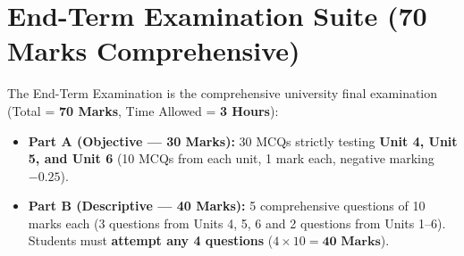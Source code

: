 \documentclass[a4paper,11pt,oneside,openany]{book}
\begin{document}
\newpage




\chapter{End-Term Examination Suite (70 Marks Comprehensive)}
\label{chap:endterm}
\noindent
The End-Term Examination is the comprehensive university final examination (Total = \textbf{70 Marks}, Time Allowed = \textbf{3 Hours}):
\begin{itemize}[leftmargin=8mm]
    \item \textbf{Part A (Objective --- 30 Marks):} 30 MCQs strictly testing \textbf{Unit 4, Unit 5, and Unit 6} (10 MCQs from each unit, 1 mark each, negative marking $-0.25$).
    \item \textbf{Part B (Descriptive --- 40 Marks):} 5 comprehensive questions of 10 marks each (3 questions from Units 4, 5, 6 and 2 questions from Units 1--6). Students must \textbf{attempt any 4 questions} ($4 \times 10 = \mathbf{40\text{ Marks}}$).
\end{itemize}

\newpage



\end{document}
